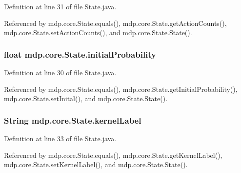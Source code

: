 Definition at line 31 of file State.\+java.



Referenced by mdp.\+core.\+State.\+equals(), mdp.\+core.\+State.\+get\+Action\+Counts(), mdp.\+core.\+State.\+set\+Action\+Counts(), and mdp.\+core.\+State.\+State().

\hypertarget{classmdp_1_1core_1_1_state_a237d2d5f81db0553a2180cf66a20472b}{}
\subsubsection[{initial\+Probability}]{\setlength{\rightskip}{0pt plus 5cm}float mdp.\+core.\+State.\+initial\+Probability\hspace{0.3cm}{\ttfamily [private]}}\label{classmdp_1_1core_1_1_state_a237d2d5f81db0553a2180cf66a20472b}


Definition at line 30 of file State.\+java.



Referenced by mdp.\+core.\+State.\+equals(), mdp.\+core.\+State.\+get\+Initial\+Probability(), mdp.\+core.\+State.\+set\+Inital(), and mdp.\+core.\+State.\+State().

\hypertarget{classmdp_1_1core_1_1_state_ac7ca184df7a0ec4141766692290c18ab}{}
\subsubsection[{kernel\+Label}]{\setlength{\rightskip}{0pt plus 5cm}String mdp.\+core.\+State.\+kernel\+Label\hspace{0.3cm}{\ttfamily [private]}}\label{classmdp_1_1core_1_1_state_ac7ca184df7a0ec4141766692290c18ab}


Definition at line 33 of file State.\+java.



Referenced by mdp.\+core.\+State.\+equals(), mdp.\+core.\+State.\+get\+Kernel\+Label(), mdp.\+core.\+State.\+set\+Kernel\+Label(), and mdp.\+core.\+State.\+State().

\hypertarget{classmdp_1_1core_1_1_state_a40b54cc46e175c748d5ce129aba70633}{}
